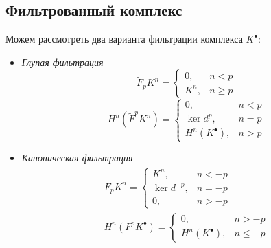\documentclass[../main.tex]{subfiles}
\begin{document}
\subsection{Фильтрованный комплекс}
Можем рассмотреть два варианта фильтрации комплекса $K^\bullet$:
\begin{itemize}
\item \textit{Глупая фильтрация}
\[
\widetilde{F}_p K^n = \begin{cases} 0, &n < p \\ K^n, & n \ge p \end{cases}
\]
\[
H^n(\widetilde{F}^p K^n) = \begin{cases} 0, &n < p\\ \ker d^p, & n=p \\ H^n(K^\bullet), & n > p \end{cases}
\]
\bee
{}
\eee
\item \textit{Каноническая фильтрация}
\begin{align*}
F_p K^n = \begin{cases} K^n, &n < -p \\ \ker d^{-p}, & n = -p \\ 0, & n>-p \end{cases}\\
H^n (F^p K^\bullet)= \begin{cases} 0, &n > -p \\ H^n(K^\bullet), & n\le-p \end{cases}
\end{align*}
\bee
{}
\eee
\end{itemize}
\end{document}
